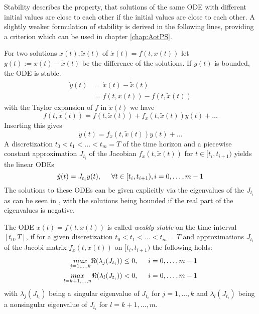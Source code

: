 \documentclass[a4paper, 12pt]{scrreprt} %
\begin{document}
Stability describes the property, that solutions of the same \ac{ODE} with different initial values are close to each other if the initial values are close to each other. A slightly weaker formulation of stability is derived in the following lines, providing a criterion which can be used in chapter \ref{chap:AotPS}.

For two solutions $x(t), \tilde{x}(t)$ of $\dot x(t) = f\left(t,x(t)\right)$ let $y(t) := x(t) - \tilde{x}(t)$ be the difference of the solutions. If $y(t)$ is bounded, the \ac{ODE} is stable.
\begin{align*}
\dot{y}(t) &= \dot{x}(t) - \dot{\tilde{x}}(t) \\
 &= f\left(t,x(t)\right) - f\left(t,\tilde{x}(t)\right)
\end{align*}
with the Taylor expansion of $f$ in $\tilde{x}(t)$ we have 
\begin{equation*}
f(t,x(t)) = f(t,\tilde{x}(t)) + f_x(t,\tilde{x}(t)) y(t) + \dots
\end{equation*}
Inserting this gives
\begin{equation}
\dot{y}(t) = f_x(t,\tilde{x}(t)) y(t) + \dots
\label{eq:ODEStab}
\end{equation}
A discretization $t_0 < t_1 < \dots < t_m = T$ of the time horizon and a piecewise constant approximation $J_{t_i}$ of the Jacobian $f_x(t,\tilde{x}(t))$ for $t \in [t_i,t_{i+1})$ yields the linear \acp{ODE} 
\begin{equation*}
\dot y(t) = J_{t_i} y(t), \hspace{0.5cm} \forall t \in [t_i, t_{i+1}), i = 0, \dots, m-1
\end{equation*}
The solutions to these \acp{ODE} can be given explicitly via the eigenvalues of the $J_{t_i}$ as can be seen in \cite{sodei}, with the solutions being bounded if the real part of the eigenvalues is negative. 

\begin{definition}
The \ac{ODE} $\dot x(t) = f\left(t,x(t)\right)$ is called \emph{weakly-stable} on the time interval $[t_0,T]$, if for a given discretization $t_0 < t_1 < \dots < t_m = T$ and approximations $J_{t_i}$ of the Jacobi matrix $f_x(t,x(t))$ on $[t_i, t_{i+1})$ the following holds:
\begin{align}
\underset{j=1,\dots,k}{max} \Re (\lambda_j(J_{t_i})) &\leq  0, \hspace{0.5cm} i=0, \dots, m-1 \\
\underset{l=k+1,\dots,n}{max} \Re (\lambda_l(J_{t_i})) &<  0, \hspace{0.5cm} i=0, \dots, m-1
\label{eq:stab2}
\end{align}
with $\lambda_j(J_{t_i})$ being a singular eigenvalue of $J_{t_i}$ for $j=1,\dots,k$ and $\lambda_l(J_{t_i})$ being a nonsingular eigenvalue of $J_{t_i}$ for $l=k+1,\dots,m$.
\end{definition}
\end{document}
